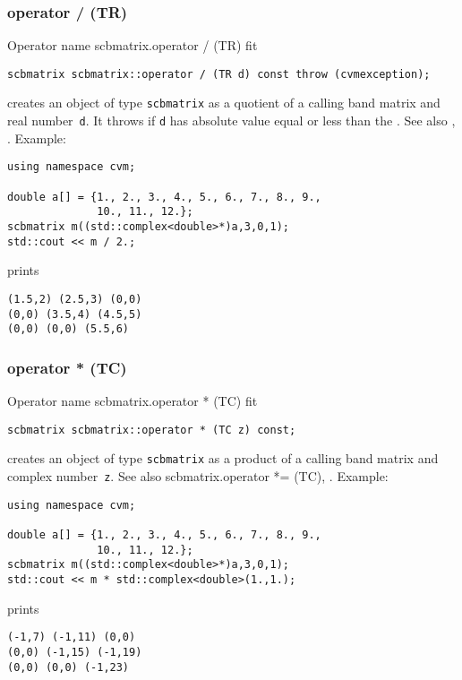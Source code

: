 \subsubsection{operator / (TR)}
Operator%
\pdfdest name {scbmatrix.operator / (TR)} fit
\begin{verbatim}
scbmatrix scbmatrix::operator / (TR d) const throw (cvmexception);
\end{verbatim}
creates an object of type \verb"scbmatrix" as a quotient of
a calling band matrix and  real number~\verb"d". It throws
if \verb"d" has  absolute value equal or less than the
.
See also ,
.
Example:
\begin{Verbatim}
using namespace cvm;

double a[] = {1., 2., 3., 4., 5., 6., 7., 8., 9.,
              10., 11., 12.};
scbmatrix m((std::complex<double>*)a,3,0,1);
std::cout << m / 2.;
\end{Verbatim}
prints
\begin{Verbatim}
(1.5,2) (2.5,3) (0,0)
(0,0) (3.5,4) (4.5,5)
(0,0) (0,0) (5.5,6)
\end{Verbatim}
\newpage



\subsubsection{operator * (TC)}
Operator%
\pdfdest name {scbmatrix.operator * (TC)} fit
\begin{verbatim}
scbmatrix scbmatrix::operator * (TC z) const;
\end{verbatim}
creates an object of type \verb"scbmatrix" as a product of
a calling band matrix and  complex number~\verb"z".
See also 
{scbmatrix.operator *= (TC)},
.
Example:
\begin{Verbatim}
using namespace cvm;

double a[] = {1., 2., 3., 4., 5., 6., 7., 8., 9.,
              10., 11., 12.};
scbmatrix m((std::complex<double>*)a,3,0,1);
std::cout << m * std::complex<double>(1.,1.);
\end{Verbatim}
prints
\begin{Verbatim}
(-1,7) (-1,11) (0,0)
(0,0) (-1,15) (-1,19)
(0,0) (0,0) (-1,23)
\end{Verbatim}
\newpage



